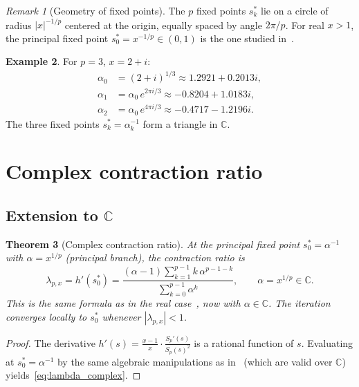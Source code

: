 \documentclass[10pt,a4paper,oneside]{book}
\newtheorem{theorem}{Theorem}[chapter]
\theoremstyle{definition}
\newtheorem{example}[theorem]{Example}
\theoremstyle{remark}
\newtheorem{remark}[theorem]{Remark}
\newcommand{\CC}{\mathbb{C}}
\begin{document}
\begin{remark}[Geometry of fixed points]
The $p$ fixed points $s_k^*$ lie on a circle of radius $|x|^{-1/p}$ centered at the origin, equally spaced by angle $2\pi/p$.  For real $x > 1$, the principal fixed point $s_0^* = x^{-1/p} \in (0,1)$ is the one studied in~\cite{besevic2026}.
\end{remark}

\begin{example}
For $p = 3$, $x = 2+i$:
\begin{align*}
  \alpha_0 &= (2+i)^{1/3} \approx 1.2921 + 0.2013i, \\
  \alpha_1 &= \alpha_0 \, e^{2\pi i/3} \approx -0.8204 + 1.0183i, \\
  \alpha_2 &= \alpha_0 \, e^{4\pi i/3} \approx -0.4717 - 1.2196i.
\end{align*}
The three fixed points $s_k^* = \alpha_k^{-1}$ form a triangle in $\CC$.
\end{example}

\section{Complex contraction ratio}
\label{sec:complex_lambda}

\subsection{Extension to \texorpdfstring{$\CC$}{C}}

\begin{theorem}[Complex contraction ratio]
\label{thm:complex_lambda}
At the principal fixed point $s_0^* = \alpha^{-1}$ with $\alpha = x^{1/p}$ (principal branch), the contraction ratio is
\begin{equation}
  \label{eq:lambda_complex}
  \lambda_{p,x} = h'(s_0^*) = \frac{(\alpha - 1)\displaystyle\sum_{k=1}^{p-1} k\,\alpha^{p-1-k}}{\displaystyle\sum_{k=0}^{p-1} \alpha^k},
  \qquad \alpha = x^{1/p} \in \CC.
\end{equation}
This is the same formula as in the real case~\cite{besevic2026}, now with $\alpha \in \CC$.  The iteration converges locally to $s_0^*$ whenever $|\lambda_{p,x}| < 1$.
\end{theorem}

\begin{proof}
The derivative $h'(s) = \frac{x-1}{x} \cdot \frac{S_p'(s)}{S_p(s)^2}$ is a rational function of $s$.  Evaluating at $s_0^* = \alpha^{-1}$ by the same algebraic manipulations as in~\cite{besevic2026} (which are valid over $\CC$) yields~\eqref{eq:lambda_complex}.
\end{proof}
\end{document}

